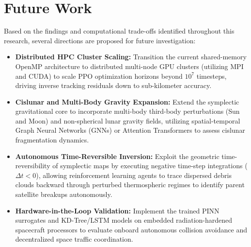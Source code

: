 \documentclass[12pt,letterpaper,twoside]{book}
\begin{document}
\section{Future Work}
Based on the findings and computational trade-offs identified throughout this research, several directions are proposed for future investigation:
\begin{itemize}
    \item \textbf{Distributed HPC Cluster Scaling:} Transition the current shared-memory OpenMP architecture to distributed multi-node GPU clusters (utilizing MPI and CUDA) to scale PPO optimization horizons beyond $10^7$ timesteps, driving inverse tracking residuals down to sub-kilometer accuracy.
    \item \textbf{Cislunar and Multi-Body Gravity Expansion:} Extend the symplectic gravitational core to incorporate multi-body third-body perturbations (Sun and Moon) and non-spherical lunar gravity fields, utilizing spatial-temporal Graph Neural Networks (GNNs) or Attention Transformers to assess cislunar fragmentation dynamics.
    \item \textbf{Autonomous Time-Reversible Inversion:} Exploit the geometric time-reversibility of symplectic maps by executing negative time-step integrations ($\Delta t < 0$), allowing reinforcement learning agents to trace dispersed debris clouds backward through perturbed thermospheric regimes to identify parent satellite breakups autonomously.
    \item \textbf{Hardware-in-the-Loop Validation:} Implement the trained PINN surrogates and KD-Tree/LSTM models on embedded radiation-hardened spacecraft processors to evaluate onboard autonomous collision avoidance and decentralized space traffic coordination.
\end{itemize}

\cleardoublepage



\end{document}
